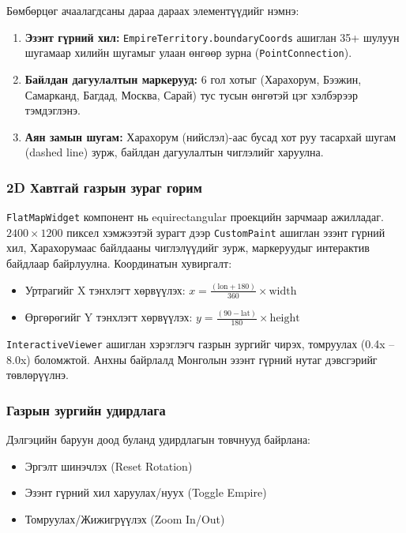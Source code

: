 Бөмбөрцөг ачаалагдсаны дараа дараах элементүүдийг нэмнэ:

\begin{enumerate}
	\item \textbf{Эзэнт гүрний хил:} \texttt{EmpireTerritory.boundaryCoords} ашиглан 35+ шулуун шугамаар хилийн шугамыг улаан өнгөөр зурна (\texttt{PointConnection}).
	\item \textbf{Байлдан дагуулалтын маркерууд:} 6 гол хотыг (Харахорум, Бээжин, Самарканд, Багдад, Москва, Сарай) тус тусын өнгөтэй цэг хэлбэрээр тэмдэглэнэ.
	\item \textbf{Аян замын шугам:} Харахорум (нийслэл)-аас бусад хот руу тасархай шугам (dashed line) зурж, байлдан дагуулалтын чиглэлийг харуулна.
\end{enumerate}

\subsubsection{2D Хавтгай газрын зураг горим}

\texttt{FlatMapWidget} компонент нь equirectangular проекцийн зарчмаар ажилладаг. $2400\times1200$ пиксел хэмжээтэй зурагт дээр \texttt{CustomPaint} ашиглан эзэнт гүрний хил, Харахорумаас байлдааны чиглэлүүдийг зурж, маркеруудыг интерактив байдлаар байрлуулна. Координатын хувиргалт:

\begin{itemize}
	\item Уртрагийг X тэнхлэгт хөрвүүлэх: $x = \frac{(\mathrm{lon} + 180)}{360} \times \mathrm{width}$
	\item Өргөрөгийг Y тэнхлэгт хөрвүүлэх: $y = \frac{(90 - \mathrm{lat})}{180} \times \mathrm{height}$
\end{itemize}

\texttt{InteractiveViewer} ашиглан хэрэглэгч газрын зургийг чирэх, томруулах (0.4x -- 8.0x) боломжтой. Анхны байрлалд Монголын эзэнт гүрний нутаг дэвсгэрийг төвлөрүүлнэ.

\subsubsection{Газрын зургийн удирдлага}

Дэлгэцийн баруун доод буланд удирдлагын товчнууд байрлана:
\begin{itemize}
	\item Эргэлт шинэчлэх (Reset Rotation)
	\item Эзэнт гүрний хил харуулах/нуух (Toggle Empire)
	\item Томруулах/Жижигрүүлэх (Zoom In/Out)
\end{itemize}

